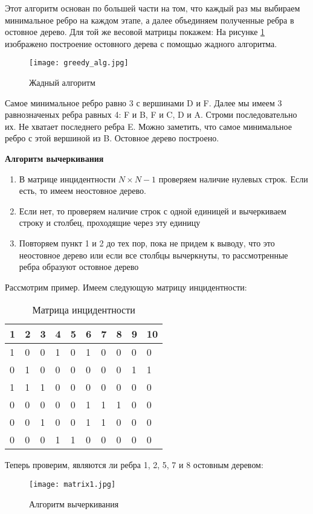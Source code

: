 Этот алгоритм основан по большей части на том, что каждый раз мы выбираем минимальное ребро
на каждом этапе, а далее объединяем полученные ребра в остовное дерево. Для той же весовой матрицы покажем:
На рисунке \ref{greedy_alg} изображено построение остовного дерева с помощью жадного алгоритма.

\begin{figure}[!h]
    \centering 
    \texttt{[image: greedy\_alg.jpg]}
    \caption{Жадный алгоритм}
    \label{greedy_alg}
\end{figure}

Самое минимальное ребро равно 3 с вершинами D и F. Далее мы имеем 3 равнозначеных ребра равных 4:
F и B, F и C, D и A. Строми последовательно их. Не хватает последнего ребра E. Можно заметить, что самое минимальное
ребро с этой вершиной из B. Остовное дерево построено.

\hspace{5mm}
\newpage
\textbf{Алгоритм вычеркивания}

\begin{enumerate}
    \item В матрице инцидентности $N \times N-1$ проверяем наличие нулевых строк. 
    Если есть, то имеем неостовное дерево.
    \item Если нет, то проверяем наличие строк с одной единицей
    и вычеркиваем строку и столбец, проходящие через эту единицу
    \item Повторяем пункт 1 и 2 до тех пор, пока не придем к выводу, что это неостовное дерево или
    если все столбцы вычеркнуты, то рассмотренные ребра образуют остовное дерево
\end{enumerate}

Рассмотрим пример. Имеем следующую матрицу инцидентности:
\begin{table}[!h]
    \centering
    \begin{tabular}[c]{ | l | l | l | l | l | l | l | l | l | l | }
        \hline
        1 & 2 & 3 & 4 & 5 & 6 & 7 & 8 & 9 & 10 \\ \hline
        1 & 0 & 0 & 1 & 0 & 1 & 0 & 0 & 0 & 0 \\ \hline
        0 & 1 & 0 & 0 & 0 & 0 & 0 & 0 & 1 & 1 \\ \hline
        1 & 1 & 1 & 0 & 0 & 0 & 0 & 0 & 0 & 0 \\ \hline
        0 & 0 & 0 & 0 & 0 & 1 & 1 & 1 & 0 & 0 \\ \hline
        0 & 0 & 1 & 0 & 0 & 1 & 1 & 0 & 0 & 0 \\ \hline
        0 & 0 & 0 & 1 & 1 & 0 & 0 & 0 & 0 & 0 \\ 
        \hline
    \end{tabular}
    \caption{Матрица инцидентности}
\end{table}
\newpage
Теперь проверим, являются ли ребра 1, 2, 5, 7 и 8 остовным деревом:
\begin{figure}[!h]
    \centering 
    \texttt{[image: matrix1.jpg]}
    \caption{Алгоритм вычеркивания}
\end{figure}

